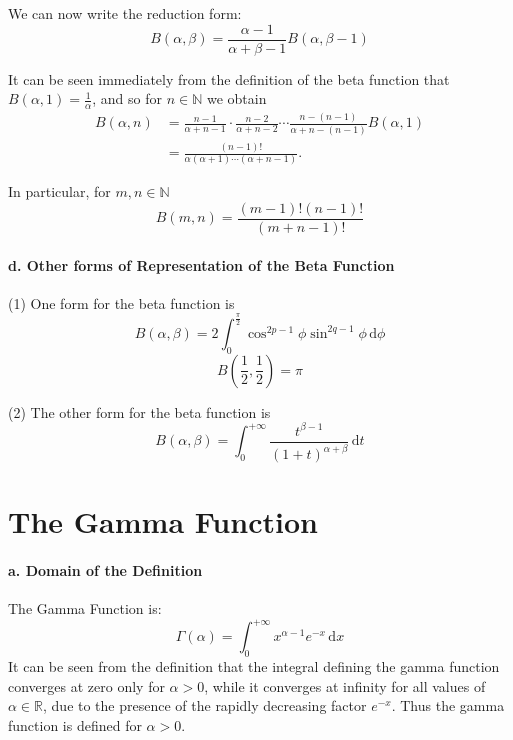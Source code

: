 \documentclass[a4paper,12pt]{article}
\begin{document}
\begin{CJK}{UTF8}{gbsn}
    We can now write the reduction form:
    \[
        B(\alpha, \beta) = \frac{\alpha - 1}{\alpha + \beta - 1}B(\alpha, \beta - 1)
        \]

    It can be seen immediately from the definition of the beta function that 
    $B(\alpha, 1) = \frac{1}{\alpha}$, and so for $n \in \mathbb{N}$ we obtain 
    \begin{equation}
        \begin{split}
            B(\alpha, n) & = \frac{n-1}{\alpha+n-1}\cdot\frac{n-2}{\alpha+n-2}\cdots
        \frac{n-(n-1)}{\alpha+n-(n-1)}B(\alpha,1)\\
            & = \frac{(n-1)!}{\alpha (\alpha+1)\cdots(\alpha+n-1)}.
        \end{split}
    \end{equation}

    In particular, for $m, n \in \mathbb{N}$
    \begin{equation}
        B(m,n) = \frac{(m-1)!(n-1)!}{(m+n-1)!}
    \end{equation}

    \paragraph{\rm \textbf{d. Other forms of Representation of the Beta Function}}

    (1) One form for the beta function is 
    \[
        B(\alpha, \beta) = 2\int_0^{\frac{\pi}{2}} \cos^{2p-1}\phi\sin^{2q-1} \phi
        \, \mathrm{d}\phi
        \]
    \[
        B\left(\frac{1}{2}, \frac{1}{2}\right) = \pi
        \]

    (2) The other form for the beta function is 
    \[
        B(\alpha, \beta) = \int_0^{+\infty} \frac{t^{\beta -1}}{(1+t)^{\alpha + \beta}}
        \, \mathrm{d}t
        \]

    \section{The Gamma Function}

    \paragraph{\rm \textbf{a. Domain of the Definition}}
    The Gamma Function is:
    \[
        \Gamma(\alpha) = \int_0^{+\infty} x^{\alpha -1}e^{-x}\, \mathrm{d}x
        \]
    It can be seen from the definition that the integral defining the gamma 
    function converges at zero only for $\alpha > 0$, while it converges at infinity 
    for all values of $\alpha \in \mathbb{R}$, due to the presence of the rapidly decreasing 
    factor $e^{-x}$. Thus the gamma function is defined for $\alpha > 0$.


\end{CJK}
\end{document}
